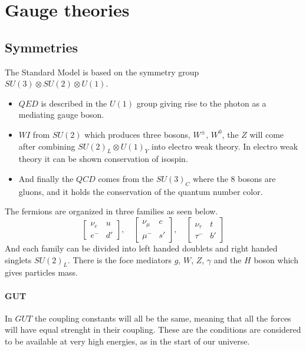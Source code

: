 \section{Gauge theories}
  \subsection{Symmetries}

    The Standard Model is based on the symmetry group $SU(3)\otimes %
    SU(2) \otimes U(1)$.
    \begin{itemize}
      \item
	$QED$ is described in the $U(1)$ group giving rise to the photon as a mediating gauge boson.

      \item
	$WI$ from $SU(2)$ which produces three bosons, $W^{\pm},\,W^0$, the $Z$ will come after
    	combining $SU(2)_L\otimes U(1)_Y$ into electro weak theory. In electro weak theory it can
	be shown conservation of isospin.  

      \item
	And finally the $QCD$ comes from the $SU(3)_C$ where the 8 bosons are gluons,
    	and it holds the conservation of the quantum number color. 
    \end{itemize} 
    
    The fermions are organized in three families as seen below.
    \[%
        \begin{bmatrix}
          \nu_e & u \\
          e^- & d'
        \end{bmatrix}%
        ,\quad%
        \begin{bmatrix}
          \nu_{\mu} & c\\
          \mu^- & s'
        \end{bmatrix}%
        ,\quad%
        \begin{bmatrix}
          \nu_{\tau} & t\\
          \tau^- & b'
        \end{bmatrix}%
    \]
    And each family can be divided into left handed doublets and right handed
    singlets $SU(2)_L$. There is the foce mediators $g$, $W$, $Z$, $\gamma$ and 
    the $H$ boson which gives particles mass.
    \paragraph{GUT}
    In $GUT$ the coupling constants will all be the same, meaning that all the forces will
    have equal strenght in their coupling. These are the conditions are considered to be
    available at very high energies, as in the start of our universe.

